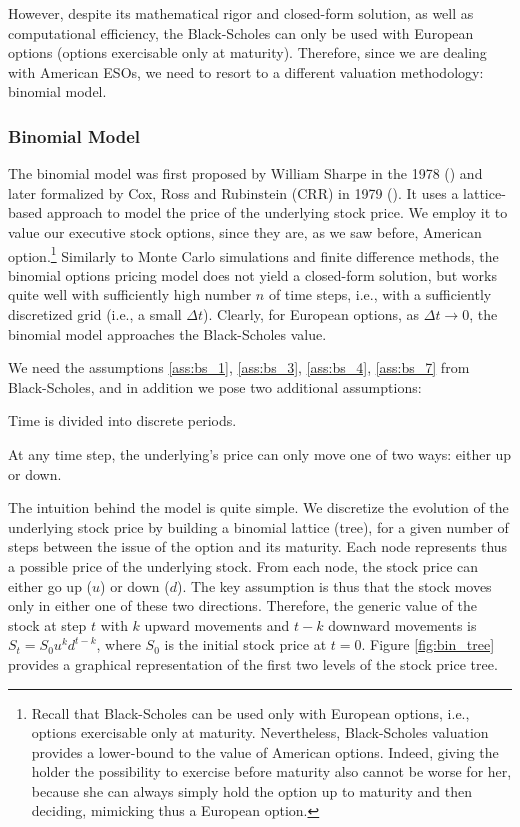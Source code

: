     However, despite its mathematical rigor and closed-form solution, as well as computational efficiency, the Black-Scholes can only be used with European options (options exercisable only at maturity). Therefore, since we are dealing with American ESOs, we need to resort to a different valuation methodology: binomial model.

\subsubsection*{Binomial Model} 
The binomial model was first proposed by William Sharpe in the 1978 (\cite{sharpe1978investments}) and later formalized by Cox, Ross and Rubinstein (CRR) in 1979 (\cite{cox1979option}). It uses a lattice-based approach to model the price of the underlying stock price. We employ it to value our executive stock options, since they are, as we saw before, American option.\footnote{Recall that Black-Scholes can be used only with European options, i.e., options exercisable only at maturity. Nevertheless, Black-Scholes valuation provides a lower-bound to the value of American options. Indeed, giving the holder the possibility to exercise before maturity also cannot be worse for her, because she can always simply hold the option up to maturity and then deciding, mimicking thus a European option.}
Similarly to Monte Carlo simulations and finite difference methods, the binomial options pricing model does not yield a closed-form solution, but works quite well with sufficiently high number $n$ of time steps, i.e., with a sufficiently discretized grid (i.e., a small $\Delta t$). Clearly, for European options, as $\Delta t \rightarrow 0$, the binomial model approaches the Black-Scholes value.

We need the assumptions \ref*{ass:bs_1}, \ref*{ass:bs_3}, \ref*{ass:bs_4}, \ref*{ass:bs_7} from Black-Scholes, and in addition we pose two additional assumptions:

\begin{assumption}
    \label{ass:bin_8}
    Time is divided into discrete periods.
\end{assumption}

\begin{assumption}
    \label{ass:bin_9}
    At any time step, the underlying's price can only move one of two ways: either up or down.
\end{assumption}

The intuition behind the model is quite simple. We discretize the evolution of the underlying stock price by building a binomial lattice (tree), for a given number of steps between the issue of the option and its maturity. Each node represents thus a possible price of the underlying stock. From each node, the stock price can either go up ($u$) or down ($d$). The key assumption is thus that the stock moves only in either one of these two directions. Therefore, the generic value of the stock at step $t$ with $k$ upward movements and $t-k$ downward movements is $S_t = S_0 u^k d^{t-k}$, where $S_0$ is the initial stock price at $t=0$. Figure \ref*{fig:bin_tree} provides a graphical representation of the first two levels of the stock price tree. 

